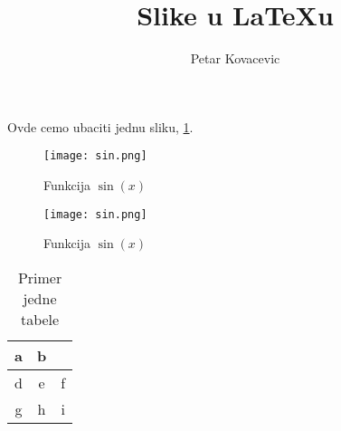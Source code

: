 \documentclass{article}
\title{Slike u LaTeXu}
\author{Petar Kovacevic}
\begin{document}
\maketitle

Ovde cemo ubaciti jednu sliku, \ref{slika:sinus}.

\begin{figure}[h!] %
	\centering
	\texttt{[image: sin.png]}

	\caption{Funkcija $\sin \left( x \right)$}
	\label{slika:sinus}
\end{figure}

\begin{figure}[h!]
	\centering
	\texttt{[image: sin.png]}
	\caption{Funkcija $\sin (x)$}
	\label{slika:sin2}
\end{figure}
 
\begin{table}[h!]
	\centering
	\caption{Primer jedne tabele}
	\bigskip
	\begin{tabular}{|c|c|c|} %
		\hline
		a & b & \phantom{xxx} \\
		\hline
		d & e & f \\
		\hline
		g & h & i \\ 
		\hline
	\end{tabular}
	\label{tabela:ime}
\end{table}
\end{document}
